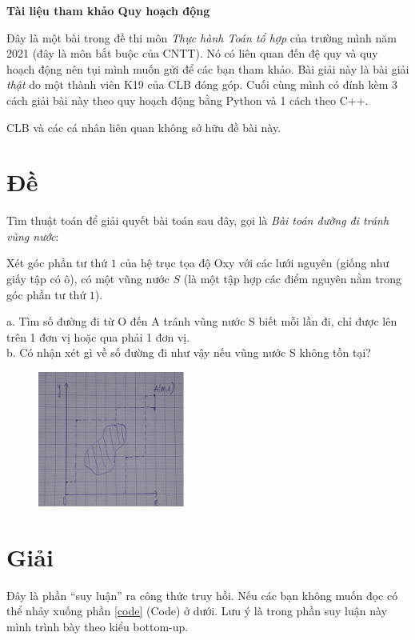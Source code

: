\documentclass[12pt]{article}
\renewcommand{\a}[1]{\ensuremath{a_{#1}}}
\begin{document}
\begin{center}
    \textbf{\Large Tài liệu tham khảo Quy hoạch động}
\end{center}

Đây là một bài trong đề thi môn \textit{Thực hành Toán tổ hợp} của trường mình năm 2021 (đây là môn bắt buộc của CNTT). Nó có liên quan đến đệ quy và quy hoạch động nên tụi mình muốn gửi để các bạn tham khảo. Bài giải này là bài giải \textit{thật} do một thành viên K19 của CLB đóng góp. Cuối cùng mình có đính kèm 3 cách giải bài này theo quy hoạch động bằng Python và 1 cách theo C++. \bigskip 

CLB và các cá nhân liên quan không sở hữu đề bài này.

\tableofcontents

\section{Đề}

Tìm thuật toán để giải quyết bài toán sau đây, gọi là
\textit{Bài toán đường đi tránh vũng nước}: \bigskip

Xét góc phần tư thứ $1$ của hệ trục tọa độ Oxy với các lưới nguyên (giống như giấy tập có ô), có một vũng nước $S$ (là một tập hợp các điểm nguyên nằm trong góc phần tư thứ $1$). \bigskip

a. Tìm số đường đi từ O đến A tránh vũng nước S biết mỗi
lần đi, chỉ được lên trên 1 đơn vị hoặc qua phải 1 đơn vị.\\
b. Có nhận xét gì về số đường đi như vậy nếu vũng nước S
không tồn tại? \bigskip

\begin{figure}[H]
    \centering
    \includegraphics[width=0.43\textwidth]{image/qhd.png}
\end{figure}

\renewcommand{\a}[2]{\ensuremath{\a_{#1,\ #2}}}
\newcommand{\s}{\ensuremath{\mathcal S} }

\section{Giải}
Đây là phần ``suy luận'' ra công thức truy hồi. Nếu các bạn không muốn đọc có thể nhảy xuống phần \ref{code} (Code) ở dưới. Lưu ý là trong phần suy luận này mình trình bày theo kiểu bottom-up.
\end{document}
